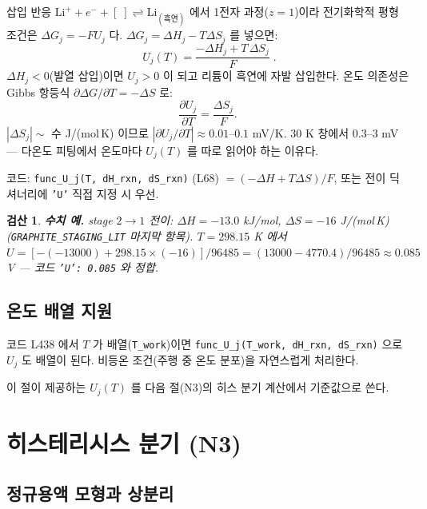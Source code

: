 \documentclass[11pt,a4paper]{article}
\newtheorem*{verifybox}{검산}
\begin{document}
삽입 반응 $\mathrm{Li}^++e^-+[\;]\rightleftharpoons\mathrm{Li}_{(\text{흑연})}$ 에서
1전자 과정($z=1$)이라 전기화학적 평형 조건은 $\Delta G_j = -FU_j$ 다.
$\Delta G_j = \Delta H_j - T\Delta S_j$ 를 넣으면:
\begin{equation}
\boxed{\;U_j(T) = \frac{-\Delta H_j + T\,\Delta S_j}{F}\;.}
\label{eq:Uj}
\end{equation}
$\Delta H_j < 0$(발열 삽입)이면 $U_j > 0$ 이 되고 리튬이 흑연에 자발 삽입한다.
온도 의존성은 Gibbs 항등식 $\partial\Delta G/\partial T = -\Delta S$ 로:
\begin{equation}
\frac{\partial U_j}{\partial T} = \frac{\Delta S_j}{F}.
\label{eq:dUdT}
\end{equation}
$|\Delta S_j|\sim$ 수 J/(mol\,K) 이므로 $|\partial U_j/\partial T|\approx0.01$--$0.1$ mV/K.
$30$ K 창에서 $0.3$--$3$ mV — 다온도 피팅에서 온도마다 $U_j(T)$ 를 따로 읽어야 하는
이유다.

코드: \texttt{func\_U\_j(T, dH\_rxn, dS\_rxn)} (L68) $= (-\Delta H+T\Delta S)/F$,
또는 전이 딕셔너리에 \texttt{'U'} 직접 지정 시 우선.

\begin{verifybox}
\textbf{수치 예.} stage $2\to1$ 전이: $\Delta H=-13.0$ kJ/mol, $\Delta S=-16$ J/(mol\,K)
(\texttt{GRAPHITE\_STAGING\_LIT} 마지막 항목). $T=298.15$ K 에서
$U=[-(-13000)+298.15\times(-16)]/96485=(13000-4770.4)/96485\approx0.085$ V — 코드 \texttt{'U': 0.085} 와 정합.
\end{verifybox}

\subsection{온도 배열 지원}

코드 L438 에서 $T$ 가 배열(\texttt{T\_work})이면 \texttt{func\_U\_j(T\_work, dH\_rxn, dS\_rxn)}
으로 $U_j$ 도 배열이 된다. 비등온 조건(주행 중 온도 분포)을 자연스럽게 처리한다.

이 절이 제공하는 $U_j(T)$ 를 다음 절(N3)의 히스 분기 계산에서 기준값으로 쓴다.

\section{히스테리시스 분기 (N3)}\label{sec:hys}

\subsection{정규용액 모형과 상분리}
\end{document}
